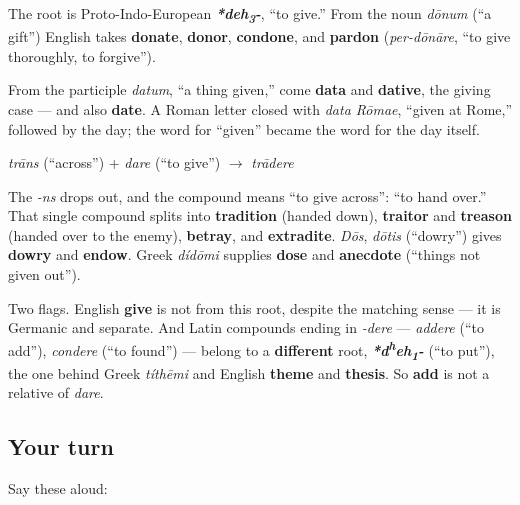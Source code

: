 \begin{cousinweb}
The root is Proto-Indo-European \emph{\textbf{*deh\textsubscript{3}-}}, \textquotedblleft{}to give.\textquotedblright{} From the noun \emph{dōnum} (\textquotedblleft{}a gift\textquotedblright{}) English takes \textbf{donate}, \textbf{donor}, \textbf{condone}, and \textbf{pardon} (\emph{per-dōnāre}, \textquotedblleft{}to give thoroughly, to forgive\textquotedblright{}).

From the participle \emph{datum}, \textquotedblleft{}a thing given,\textquotedblright{} come \textbf{data} and \textbf{dative}, the giving case — and also \textbf{date}. A Roman letter closed with \emph{data Rōmae}, \textquotedblleft{}given at Rome,\textquotedblright{} followed by the day; the word for \textquotedblleft{}given\textquotedblright{} became the word for the day itself.

\emph{trāns} (\textquotedblleft{}across\textquotedblright{}) + \emph{dare} (\textquotedblleft{}to give\textquotedblright{}) $\to$ \emph{trādere}

The \emph{-ns} drops out, and the compound means \textquotedblleft{}to give across\textquotedblright{}: \textquotedblleft{}to hand over.\textquotedblright{} That single compound splits into \textbf{tradition} (handed down), \textbf{traitor} and \textbf{treason} (handed over to the enemy), \textbf{betray}, and \textbf{extradite}. \emph{Dōs}, \emph{dōtis} (\textquotedblleft{}dowry\textquotedblright{}) gives \textbf{dowry} and \textbf{endow}. Greek \emph{dídōmi} supplies \textbf{dose} and \textbf{anecdote} (\textquotedblleft{}things not given out\textquotedblright{}).

Two flags. English \textbf{give} is not from this root, despite the matching sense — it is Germanic and separate. And Latin compounds ending in \emph{-dere} — \emph{addere} (\textquotedblleft{}to add\textquotedblright{}), \emph{condere} (\textquotedblleft{}to found\textquotedblright{}) — belong to a \textbf{different} root, \emph{\textbf{*d\textsuperscript{h}eh\textsubscript{1}-}} (\textquotedblleft{}to put\textquotedblright{}), the one behind Greek \emph{títhēmi} and English \textbf{theme} and \textbf{thesis}. So \textbf{add} is not a relative of \emph{dare}.
\end{cousinweb}

\subsection*{Your turn}
Say these aloud:

